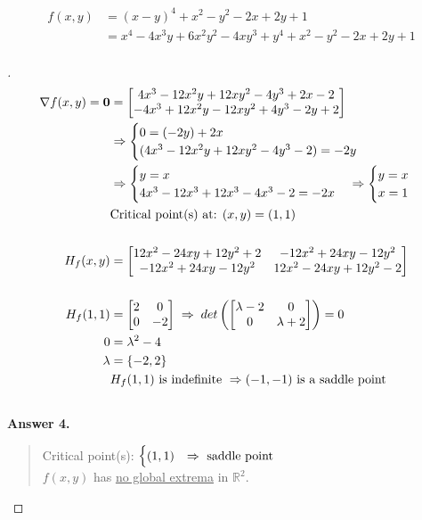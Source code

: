 \documentclass[12pt]{article}
\newenvironment{exercise}[2][Exercise]{\begin{trivlist}
\item[\hskip \labelsep {\bfseries #1}\hskip \labelsep {\bfseries #2.}]}{\end{trivlist}}
\begin{document}
\pagebreak
\begin{exercise}{4}
	\begin{align*}
		f(x,y) &= (x - y)^4 + x^2 - y^2 - 2x + 2y + 1 \\
		 &= x^4 - 4x^3y + 6x^2y^2 - 4xy^3 + y^4 + x^2 - y^2 - 2x + 2y + 1 \\
	\end{align*}
\end{exercise}
\begin{proof}[]
	\begin{align*}
		\nabla f(x,y) = \bm{0} &= \begin{bmatrix} 4x^3 - 12x^2y + 12xy^2 - 4y^3 + 2x - 2 \\ -4x^3 + 12x^2y - 12xy^2 + 4y^3 - 2y + 2 \end{bmatrix} \\
		&\Rightarrow
		\begin{cases} 0 = (-2y) + 2x \\ (4x^3 - 12x^2y + 12xy^2 - 4y^3 - 2) = -2y \end{cases} \\
		& \Rightarrow
		\begin{cases} y = x \\ 4x^3 - 12x^3 + 12x^3 - 4x^3 - 2 = -2x\end{cases}
		\Rightarrow
		\begin{cases} y = x \\ x = 1 \end{cases}  \\
		& \textnormal{Critical point(s) at: } (x,y) = (1, 1) \\[15pt]
		H_f(x,y) &= \begin{bmatrix} 12x^2 - 24xy + 12y^2 + 2 & -12x^2 + 24xy - 12y^2 \\ -12x^2 + 24xy - 12y^2 & 12x^2 - 24xy + 12y^2 - 2 \end{bmatrix} \\[15pt]
		H_f(1, 1) &= \begin{bmatrix} 2 & 0 \\ 0 & -2 \end{bmatrix} \; \Rightarrow \; det\left( \begin{bmatrix} \lambda -2 & 0 \\ 0 & \lambda + 2 \end{bmatrix} \right) = 0 \\
		0 &= \lambda^2 - 4 \\
		\lambda &= \left\lbrace -2, 2 \right\rbrace \\
		& H_f(1, 1) \textnormal{ is indefinite } \Rightarrow (-1, -1) \textnormal{ is a saddle point} \\[15pt]
	\end{align*}
	\textbf{Answer 4.} \vspace{-5mm} \\
	\begin{quote}
		Critical point(s): $ \begin{cases}
		(1, 1) & \Rightarrow \textnormal{ saddle point} \\
		\end{cases}	$ \\
		$f(x,y)$ has \underline{no global extrema} in $\mathbb{R}^2$.
	\end{quote}
\end{proof}
\end{document}
